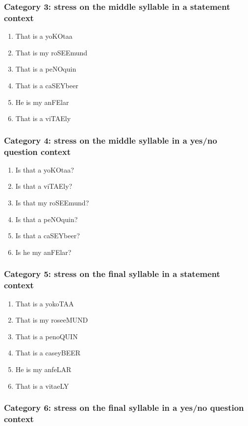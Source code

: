 \documentclass[a4paper]{article}
\begin{document}
\subsubsection{Category 3: stress on the middle syllable in a statement context}

\begin{enumerate}
\item That is a yoKOtaa
\item That is my roSEEmund
\item That is a peNOquin
\item That is a caSEYbeer
\item He is my anFElar
\item That is a viTAEly
\end{enumerate}

\subsubsection{Category 4: stress on the middle syllable in a yes/no question context}

\begin{enumerate}
\item Is that a yoKOtaa?
\item Is that a viTAEly?
\item Is that my roSEEmund?
\item Is that a peNOquin?
\item Is that a caSEYbeer?
\item Is he my anFElar?
\end{enumerate}

\subsubsection{Category 5: stress on the final syllable in a statement context}

\begin{enumerate}
\item That is a yokoTAA
\item That is my roseeMUND
\item That is a penoQUIN
\item That is a caseyBEER
\item He is my anfeLAR
\item That is a vitaeLY
\end{enumerate}

\subsubsection{Category 6: stress on the final syllable in a yes/no question context}
\end{document}
